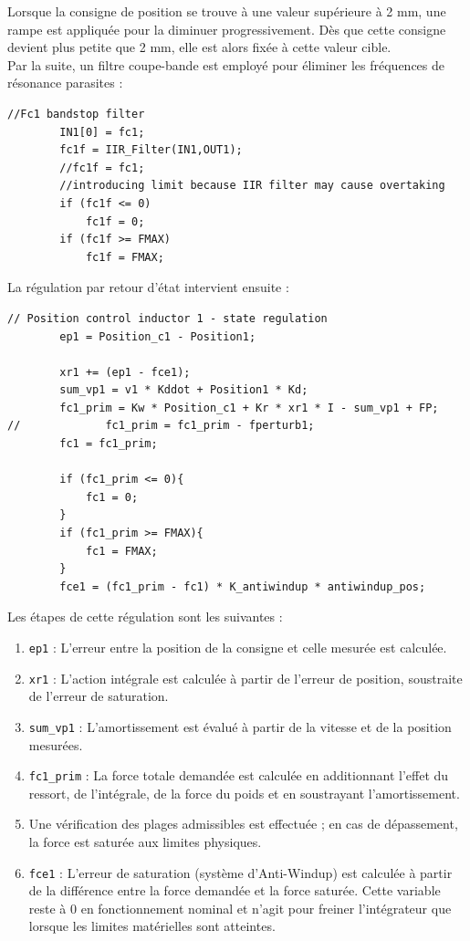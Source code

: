 Lorsque la consigne de position se trouve à une valeur supérieure à 2 mm, une rampe est appliquée pour la diminuer progressivement. Dès que cette consigne devient plus petite que 2 mm, elle est alors fixée à cette valeur cible.\\

Par la suite, un filtre coupe-bande est employé pour éliminer les fréquences de résonance parasites :

\begin{verbatim}
//Fc1 bandstop filter
        IN1[0] = fc1;
        fc1f = IIR_Filter(IN1,OUT1);
        //fc1f = fc1;
        //introducing limit because IIR filter may cause overtaking
        if (fc1f <= 0)
            fc1f = 0;
        if (fc1f >= FMAX)
            fc1f = FMAX;
\end{verbatim}

La régulation par retour d'état intervient ensuite :

\begin{verbatim}
// Position control inductor 1 - state regulation
        ep1 = Position_c1 - Position1;

        xr1 += (ep1 - fce1);
        sum_vp1 = v1 * Kddot + Position1 * Kd;
        fc1_prim = Kw * Position_c1 + Kr * xr1 * I - sum_vp1 + FP;
//             fc1_prim = fc1_prim - fperturb1;
        fc1 = fc1_prim;

        if (fc1_prim <= 0){
            fc1 = 0;
        }
        if (fc1_prim >= FMAX){
            fc1 = FMAX;
        }
        fce1 = (fc1_prim - fc1) * K_antiwindup * antiwindup_pos;
\end{verbatim}

Les étapes de cette régulation sont les suivantes :

\begin{enumerate}
    \item \texttt{ep1} : L'erreur entre la position de la consigne et celle mesurée est calculée.
    \item \texttt{xr1} : L'action intégrale est calculée à partir de l'erreur de position, soustraite de l'erreur de saturation.
    \item \texttt{sum\_vp1} : L'amortissement est évalué à partir de la vitesse et de la position mesurées.
    \item \texttt{fc1\_prim} : La force totale demandée est calculée en additionnant l'effet du ressort, de l'intégrale, de la force du poids et en soustrayant l'amortissement.
    \item Une vérification des plages admissibles est effectuée ; en cas de dépassement, la force est saturée aux limites physiques.
    \item \texttt{fce1} : L'erreur de saturation (système d'Anti-Windup) est calculée à partir de la différence entre la force demandée et la force saturée. Cette variable reste à 0 en fonctionnement nominal et n'agit pour freiner l'intégrateur que lorsque les limites matérielles sont atteintes.
\end{enumerate}

